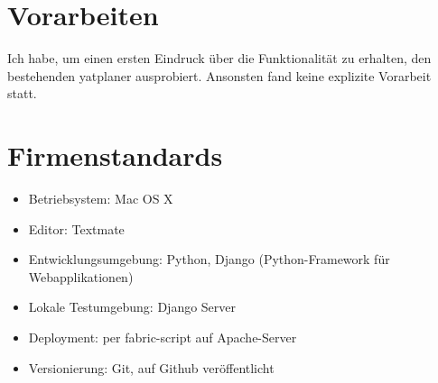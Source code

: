 \section{Vorarbeiten}
Ich habe, um einen ersten Eindruck über die Funktionalität zu erhalten, den bestehenden yatplaner ausprobiert.
Ansonsten fand keine explizite Vorarbeit statt.

\section{Firmenstandards}
\begin{itemize}
    \item Betriebsystem: Mac OS X
    \item Editor: Textmate
    \item Entwicklungsumgebung: Python, Django (Python-Framework für Webapplikationen)
    \item Lokale Testumgebung: Django Server
    \item Deployment: per fabric-script auf Apache-Server
    \item Versionierung: Git, auf Github veröffentlicht
\end{itemize}
\clearpage
